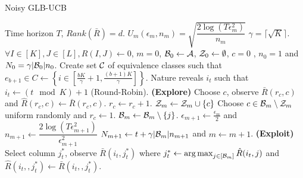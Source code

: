 \begin{algorithm}[!th]
\caption{Noisy GLB-UCB}
\label{alg:NGLB}
\begin{algorithmic}[1]
 Time horizon $T$, $Rank(\bar{R}) = d$.
 $U_m(\epsilon_m, n_m) = \sqrt{\dfrac{2\log(T\epsilon_m^2)}{n_m} }$
 $\gamma = \lceil\sqrt{K} \rceil$.
 $\forall I\in [K], J\in [L], \hat{R}(I,J) \leftarrow 0$, $m=0$, $\mathcal{B}_0 \leftarrow \mathcal{A}$, $\mathcal{Z}_0 \leftarrow \emptyset$, $c=0$ , $n_0 = 1 $ and $N_0 = \gamma |\mathcal{B}_0|n_0$.
\State Create set $\mathcal{C}$ of equivalence classes such that 
\State  $e_{b+1}\in C \leftarrow \left\lbrace i\in \left[\frac{bK}{\gamma}+1,\frac{(b+1)K}{\gamma}\right]\right\rbrace$.
\EndFor
{}	
\State Nature reveals $i_t$ such that $i_t \leftarrow (t \mod K) + 1$ (Round-Robin).
 \textbf{ (Explore) }
\State Choose $c$, observe $\bar{R}(r_c,c)$ and $\hat{R}(r_c,c)\leftarrow \bar{R}(r_c,c)$.
\State $r_c \leftarrow r_c + 1$.
\Else
\State $\mathcal{Z}_m \leftarrow \mathcal{Z}_m \cup \lbrace c\rbrace$
\State Choose $c\in\mathcal{B}_m\setminus \mathcal{Z}_m$ uniform randomly and $r_c \leftarrow 1$.
\EndIf
\Else
\ColElim
\State {}
\State {}
\State $\mathcal{B}_m \leftarrow \mathcal{B}_m \setminus \lbrace j \rbrace$. 
\EndIf
\EndFor
\EndColElim
\ResParam
\State $\epsilon_{m+1} \leftarrow \frac{\epsilon_m}{2}$ and $n_{m+1} \leftarrow \dfrac{2\log(T\epsilon_{m+1}^2)}{\epsilon_{m+1}^2} $
\State $N_{m+1} \leftarrow t + \gamma |\mathcal{B}_m|n_{m+1}$ and $m \leftarrow m + 1$.
\EndResParam
\EndIf
\Else \textbf{  (Exploit) }
\State  Select column $j_t^*$, observe $\bar{R}(i_t,j_t^*)$ where $j_t^* \leftarrow \mathop{\rm arg\,max}_{j\in[\mathcal{B}_m]} {\hat{R}(i_t,j)}$ and $\hat{R}(i_t,,j_t^*)\leftarrow \bar{R}(i_t,,j_t^*)$.
\EndIf
\EndFor
\end{algorithmic}
\end{algorithm}


